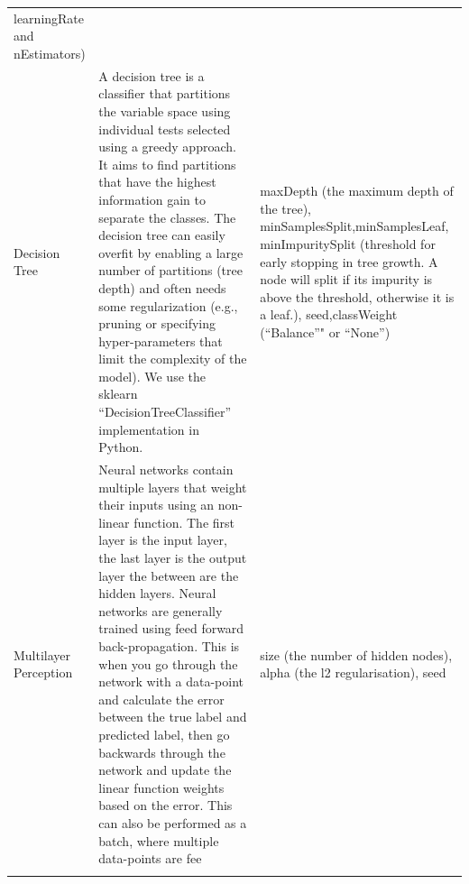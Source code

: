 \documentclass[]{article}
\begin{document}
\begin{longtable}[]{@{}lll@{}}
\begin{minipage}[t]{0.25\columnwidth}
learningRate and nEstimators)\strut
\end{minipage}\tabularnewline
\begin{minipage}[t]{0.12\columnwidth}\raggedright\strut
Decision Tree\strut
\end{minipage} & \begin{minipage}[t]{0.55\columnwidth}\raggedright\strut
A decision tree is a classifier that partitions the variable space using
individual tests selected using a greedy approach. It aims to find
partitions that have the highest information gain to separate the
classes. The decision tree can easily overfit by enabling a large number
of partitions (tree depth) and often needs some regularization (e.g.,
pruning or specifying hyper-parameters that limit the complexity of the
model). We use the sklearn ``DecisionTreeClassifier'' implementation in
Python.\strut
\end{minipage} & \begin{minipage}[t]{0.25\columnwidth}\raggedright\strut
maxDepth (the maximum depth of the tree),
minSamplesSplit,minSamplesLeaf, minImpuritySplit (threshold for early
stopping in tree growth. A node will split if its impurity is above the
threshold, otherwise it is a leaf.), seed,classWeight (``Balance''" or
``None'')\strut
\end{minipage}\tabularnewline
\begin{minipage}[t]{0.12\columnwidth}\raggedright\strut
Multilayer Perception\strut
\end{minipage} & \begin{minipage}[t]{0.55\columnwidth}\raggedright\strut
Neural networks contain multiple layers that weight their inputs using
an non-linear function. The first layer is the input layer, the last
layer is the output layer the between are the hidden layers. Neural
networks are generally trained using feed forward back-propagation. This
is when you go through the network with a data-point and calculate the
error between the true label and predicted label, then go backwards
through the network and update the linear function weights based on the
error. This can also be performed as a batch, where multiple data-points
are fee\strut
\end{minipage} & \begin{minipage}[t]{0.25\columnwidth}\raggedright\strut
size (the number of hidden nodes), alpha (the l2 regularisation),
seed\strut
\end{minipage}\tabularnewline
\begin{minipage}[t]{0.12\columnwidth}\raggedright\strut

\end{minipage}
\end{longtable}
\end{document}
